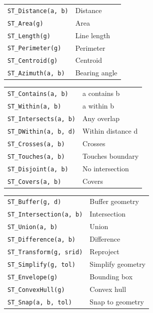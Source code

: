 \documentclass[10pt]{extarticle}
\begin{document}
\begin{multicols}{2}
\begin{tabularx}{\linewidth}{@{}l@{\enspace}Y@{}}
\texttt{ST\_Distance(a, b)}         & Distance \\
\texttt{ST\_Area(g)}                 & Area \\
\texttt{ST\_Length(g)}               & Line length \\
\texttt{ST\_Perimeter(g)}           & Perimeter \\
\texttt{ST\_Centroid(g)}            & Centroid \\
\texttt{ST\_Azimuth(a, b)}          & Bearing angle \\
\end{tabularx}

\begin{tabularx}{\linewidth}{@{}l@{\enspace}Y@{}}
\texttt{ST\_Contains(a, b)}         & a contains b \\
\texttt{ST\_Within(a, b)}           & a within b \\
\texttt{ST\_Intersects(a, b)}       & Any overlap \\
\texttt{ST\_DWithin(a, b, d)}       & Within distance d \\
\texttt{ST\_Crosses(a, b)}          & Crosses \\
\texttt{ST\_Touches(a, b)}          & Touches boundary \\
\texttt{ST\_Disjoint(a, b)}         & No intersection \\
\texttt{ST\_Covers(a, b)}           & Covers \\
\end{tabularx}

\begin{tabularx}{\linewidth}{@{}l@{\enspace}Y@{}}
\texttt{ST\_Buffer(g, d)}           & Buffer geometry \\
\texttt{ST\_Intersection(a, b)}     & Intersection \\
\texttt{ST\_Union(a, b)}            & Union \\
\texttt{ST\_Difference(a, b)}       & Difference \\
\texttt{ST\_Transform(g, srid)}     & Reproject \\
\texttt{ST\_Simplify(g, tol)}       & Simplify geometry \\
\texttt{ST\_Envelope(g)}            & Bounding box \\
\texttt{ST\_ConvexHull(g)}          & Convex hull \\
\texttt{ST\_Snap(a, b, tol)}        & Snap to geometry \\
\end{tabularx}


\end{multicols}
\end{document}
